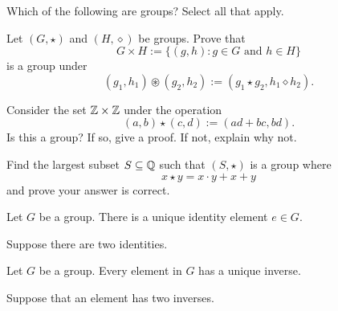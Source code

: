 \documentclass{ximera}
\begin{document}
\begin{exercise} %
  Which of the following are groups? Select all that apply.
  \begin{selectAll}
  \end{selectAll}
\end{exercise}

\begin{exercise}
  Let $(G,\star)$ and $(H,\diamond)$ be groups. Prove that
  \[
  G\times H := \{(g,h): \text{$g\in G$ and $h\in H$}\}
  \]
  is a group under
  \[
  (g_1,h_1) \circledast (g_2,h_2) := (g_1\star g_2, h_1\diamond h_2).
  \]
\end{exercise}

\begin{exercise}
  Consider the set $\mathbb Z\times \mathbb Z$ under the operation
  \[
  (a,b) \star(c,d) := (ad+bc,bd).
  \]
  Is this a group? If so, give a proof. If not, explain why not.
\end{exercise}


\begin{exercise}
  Find the largest subset $S\subseteq \mathbb Q$ such that $(S,\star)$ is a
  group where
  \[
  x\star y = x\cdot y + x + y
  \]
  and prove your answer is correct.
\end{exercise}




\begin{lemma}
  Let $G$ be a group. There is a unique identity element $e\in G$.
  \begin{sketch}
    Suppose there are two identities.
  \end{sketch}
\end{lemma}


\begin{lemma}
  Let $G$ be a group. Every element in $G$ has a unique inverse.
  \begin{sketch}
    Suppose that an element has two inverses.
  \end{sketch}
\end{lemma}
\end{document}
